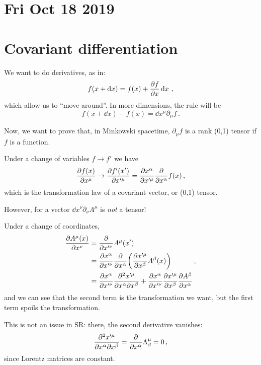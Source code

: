 \documentclass[main.tex]{subfiles}
\begin{document}
\section*{Fri Oct 18 2019}

\section{Covariant differentiation}

We want to do derivatives, as in: 
%
\begin{equation}
  f(x + \dd{x} ) = f(x) + \pdv{f}{x} \dd{x} 
\,,
\end{equation}
%
which allow us to ``move around''. In more dimensions,  the rule will be 
%
\begin{equation}
  f(x + \dd{x} ) - f(x) = \dd{x^{\mu }} \partial_\mu f
\,.
\end{equation}
%

Now, we want to prove that, in Minkowski spacetime, \(\partial_\mu f\) is a rank (0,1) tensor if \(f\) is a function.

Under a change of variables \(f \rightarrow f'\) we have 
%
\begin{equation}
  \pdv{f(x)}{x^{\mu }} \rightarrow \pdv{f' (x')}{x^{\prime \mu }} = \pdv{x^{\alpha }}{x^{\prime \mu }} \pdv{}{x^{\alpha }} f(x) 
\,,
\end{equation}
%
which is the transformation law of a covariant vector, or (0,1) tensor.

However, for a vector \(\dd{x^{\nu }} \partial_\nu A^{\mu }\) is \emph{not} a tensor!

Under a change of coordinates, 
%
\begin{subequations}
\begin{align}
  \pdv{A^{\mu}(x)}{x^{\nu }}  &= \pdv{}{x^{\prime \nu }} A^{\mu }(x')   \\
  &= \pdv{x^{\alpha }}{x^{\prime \nu }} \pdv{}{x^{\alpha }} \qty(\pdv{x^{\prime \mu }}{x^{\beta }} A^{\beta  }(x))    \\
  &= \pdv{x^{\alpha }}{x^{\prime \nu }} \pdv[2]{x^{\prime \mu }}{x^{\alpha }}{x^{\beta }} +
  \pdv{x^{\alpha }}{x^{\prime \nu }} \pdv{x^{\prime \mu }}{x^{\beta }} \pdv{A^{\beta }}{x^{\alpha }}    
\end{align}
\,,
\end{subequations}
%
and we can see that the second term is the transformation we want, but the first term spoils the transformation. 

This is not an issue in SR: there, the second derivative vanishes:
%
\begin{equation}
    \pdv[2]{x^{\prime \mu }}{x^{\alpha }}{x^{\beta }}
    = \pdv{}{x^{\alpha }} \Lambda^{\mu }_{\beta } = 0 
\,,
\end{equation}
%
since Lorentz matrices are constant.
\end{document}
